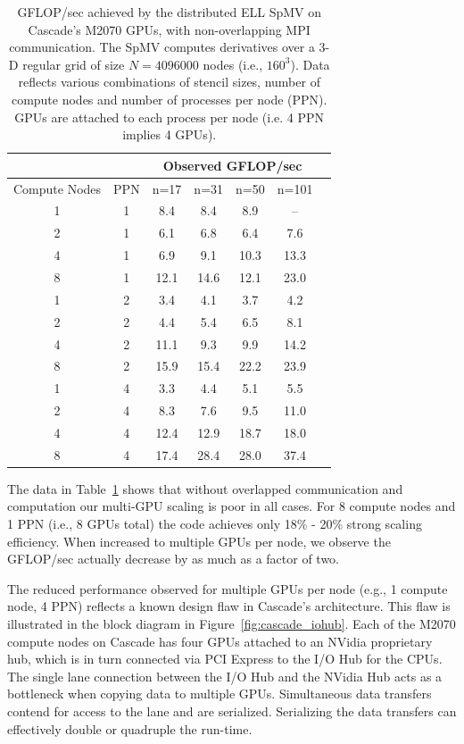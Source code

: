 \begin{table}[htb]
\centering
\caption{GFLOP/sec achieved by the distributed ELL SpMV on Cascade's M2070 GPUs, with non-overlapping MPI communication. The SpMV computes derivatives over a 3-D regular grid of size $N=4096000$ nodes (i.e., $160^3$). Data reflects various combinations of stencil sizes, number of compute nodes and number of processes per node (PPN). GPUs are attached to each process per node (i.e. 4 PPN implies 4 GPUs). }
\label{tbl:cascade_m2070_nonoverlap}
\begin{tabular}{c|c|c|c|c|c|c}
 \multicolumn{2}{c}{ } & \multicolumn{4}{|c|}{Observed GFLOP/sec} \\  \hline
Compute Nodes &   PPN  &   n=17   &   n=31   &   n=50   &   n=101   \\ \hline
1  &  1  &  8.4  &  8.4  &  8.9  & --  \\
2  &  1  &  6.1  &  6.8  &  6.4  &  7.6 \\
4  &  1  &  6.9  &  9.1  &  10.3  &  13.3 \\
8  &  1  &  12.1  &  14.6  &  12.1  &  23.0 \\ \hline
1  &  2  &  3.4  &  4.1  &  3.7  &  4.2 \\
2  &  2  &  4.4  &  5.4  &  6.5  &  8.1 \\
4  &  2  &  11.1  &  9.3  &  9.9  &  14.2 \\
8  &  2  &  15.9  &  15.4  &  22.2  &  23.9 \\ \hline
1  &  4  &  3.3  &  4.4  &  5.1  &  5.5 \\
2  &  4  &  8.3  &  7.6  &  9.5  &  11.0 \\
4  &  4  &  12.4  &  12.9  &  18.7  &  18.0 \\
8  &  4  &  17.4  &  28.4  &  28.0  &  37.4 
\end{tabular} 
\end{table}

The data in Table~\ref{tbl:cascade_m2070_nonoverlap} shows that without overlapped communication and computation our multi-GPU scaling is poor in all cases. For 8 compute nodes and 1 PPN (i.e., 8 GPUs total) the code achieves only 18\% - 20\% strong scaling efficiency. When increased to multiple GPUs per node, we observe the GFLOP/sec actually decrease by as much as a factor of two. 

The reduced performance observed for multiple GPUs per node (e.g., 1 compute node, 4 PPN) reflects a known design flaw in Cascade's architecture. This flaw is illustrated in the block diagram in Figure~\ref{fig:cascade_iohub}. Each of the M2070 compute nodes on Cascade has four GPUs attached to an NVidia proprietary hub, which is in turn connected via PCI Express to the I/O Hub for the CPUs. The single lane connection between the I/O Hub and the NVidia Hub acts as a bottleneck when copying data to multiple GPUs. Simultaneous data transfers contend for access to the lane and are serialized. Serializing the data transfers can effectively double or quadruple the run-time. 

